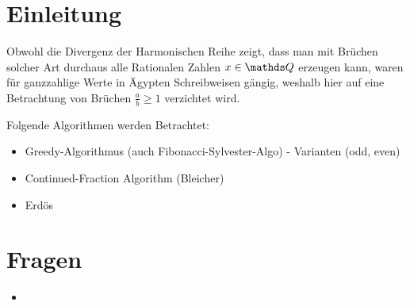\section{Einleitung}

Obwohl die Divergenz der Harmonischen Reihe zeigt, dass man mit Brüchen solcher Art durchaus alle Rationalen Zahlen $x \in \Q$ erzeugen kann, waren für ganzzahlige Werte in Ägypten Schreibweisen gängig, weshalb hier auf eine Betrachtung von Brüchen $\frac{a}{b} \geq 1$ verzichtet wird.

Folgende Algorithmen werden Betrachtet:
\begin{itemize}
	\item Greedy-Algorithmus (auch Fibonacci-Sylvester-Algo)
		\subitem - Varianten (odd, even)
	\item Continued-Fraction Algorithm (Bleicher)
	\item Erdös
\end{itemize}

\section*{Fragen}
\begin{itemize}
	\item
\end{itemize}